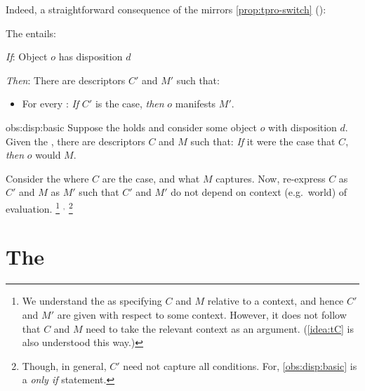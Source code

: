 \begin{note}
  Indeed, a straightforward consequence of the  mirrors \autoref{prop:tpro-switch} ():

  \begin{proposition}%
    \label{obs:disp:basic}%
    The  entails:

    \begin{itenum}
    \item[\emph{If}:]
      Object \(o\) has disposition \(d\)
    \item[\emph{Then}:]
      There are descriptors \(C'\) and \(M'\) such that:
      \begin{itemize}
      \item
        For every :
        \emph{If} \(C'\) is the case, \emph{then} \(o\) manifests \(M'\).
      \end{itemize}
    \end{itenum}
    \vspace{-\baselineskip}
  \end{proposition}

  \begin{argument}{obs:disp:basic}
    Suppose the  holds and consider some object \(o\) with disposition \(d\).
    Given the , there are descriptors \(C\) and \(M\) such that:
    \emph{If} it were the case that \(C\), \emph{then} \(o\) would \(M\).

    Consider the  where \(C\) are the case, and what \(M\) captures.
    Now, re-express \(C\) as \(C'\) and \(M\) as \(M'\) such that \(C'\) and \(M'\) do not depend on context (e.g.\ world) of evaluation.%
    \footnote{
      We understand the \dBCAa{} as specifying \(C\) and \(M\) relative to a context, and hence \(C'\) and \(M'\) are given with respect to some context.
      However, it does not follow that \(C\) and \(M\) need to take the relevant context as an argument.
      (\autoref{idea:tC} is also understood this way.)
    }%
    \(^{,}\)%
    \footnote{
      Though, in general, \(C'\) need not capture all conditions.
      For, \autoref{obs:disp:basic} is a \emph{only if} statement.
    }
  \end{argument}
\end{note}


\section{The \dSCA{}}
\label{sec:dsca2}


